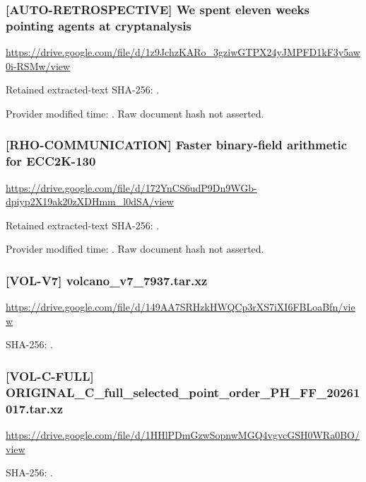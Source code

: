 \par\noindent\begin{minipage}{\linewidth}\small
\subsubsection*{[AUTO-RETROSPECTIVE] We spent eleven weeks pointing agents at cryptanalysis}\label{art:AUTO-RETROSPECTIVE}
\url{https://drive.google.com/file/d/1z9JchzKARo_3gziwGTPX24yJMPFD1kF3y5aw0i-RSMw/view}
\par Retained extracted-text SHA-256: .
\par Provider modified time: . Raw document hash not asserted.
\end{minipage}\par\medskip

\par\noindent\begin{minipage}{\linewidth}\small
\subsubsection*{[RHO-COMMUNICATION] Faster binary-field arithmetic for ECC2K-130}\label{art:RHO-COMMUNICATION}
\url{https://drive.google.com/file/d/172YnCS6udP9Dn9WGb-dpiyp2X19ak20zXDHmm_l0dSA/view}
\par Retained extracted-text SHA-256: .
\par Provider modified time: . Raw document hash not asserted.
\end{minipage}\par\medskip

\par\noindent\begin{minipage}{\linewidth}\small
\subsubsection*{[VOL-V7] volcano\_v7\_7937.tar.xz}\label{art:VOL-V7}
\url{https://drive.google.com/file/d/149AA7SRHzkHWQCp3rXS7iXI6FBLoaBfn/view}
\par SHA-256: .
\end{minipage}\par\medskip

\par\noindent\begin{minipage}{\linewidth}\small
\subsubsection*{[VOL-C-FULL] ORIGINAL\_C\_full\_selected\_point\_order\_PH\_FF\_20261017.tar.xz}\label{art:VOL-C-FULL}
\url{https://drive.google.com/file/d/1HHlPDmGzwSopnwMGQ4vgvcGSH0WRa0BO/view}
\par SHA-256: .
\end{minipage}\par\medskip


